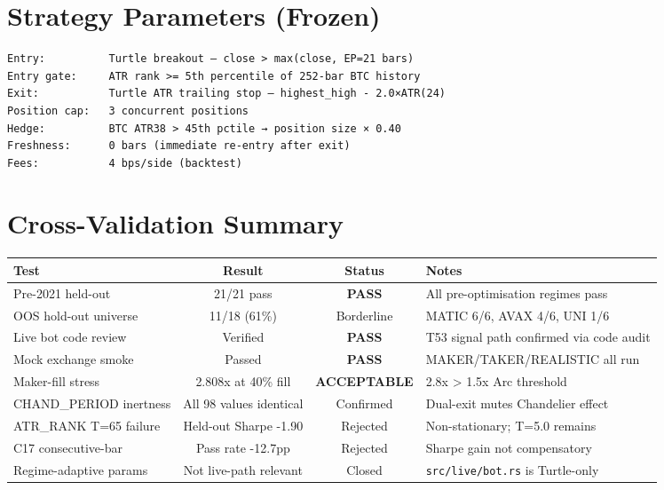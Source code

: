 \documentclass[12pt,a4paper]{article}
\begin{document}
\section{Strategy Parameters (Frozen)}

\begin{verbatim}
Entry:          Turtle breakout — close > max(close, EP=21 bars)
Entry gate:     ATR rank >= 5th percentile of 252-bar BTC history
Exit:           Turtle ATR trailing stop — highest_high - 2.0×ATR(24)
Position cap:   3 concurrent positions
Hedge:          BTC ATR38 > 45th pctile → position size × 0.40
Freshness:      0 bars (immediate re-entry after exit)
Fees:           4 bps/side (backtest)
\end{verbatim}

\section{Cross-Validation Summary}

\begin{center}
\small
\begin{tabular}{l|c|c|p{2.8in}}
\textbf{Test} & \textbf{Result} & \textbf{Status} & \textbf{Notes} \\ \midrule
Pre-2021 held-out & 21/21 pass & \textbf{PASS} & All pre-optimisation regimes pass \\
OOS hold-out universe & 11/18 (61\%) & Borderline & MATIC 6/6, AVAX 4/6, UNI 1/6 \\
Live bot code review & Verified & \textbf{PASS} & T53 signal path confirmed via code audit \\
Mock exchange smoke & Passed & \textbf{PASS} & MAKER/TAKER/REALISTIC all run \\
Maker-fill stress & 2.808x at 40\% fill & \textbf{ACCEPTABLE} & 2.8x > 1.5x Arc threshold \\
CHAND\_PERIOD inertness & All 98 values identical & Confirmed & Dual-exit mutes Chandelier effect \\
ATR\_RANK T=65 failure & Held-out Sharpe -1.90 & Rejected & Non-stationary; T=5.0 remains \\
C17 consecutive-bar & Pass rate -12.7pp & Rejected & Sharpe gain not compensatory \\
Regime-adaptive params & Not live-path relevant & Closed & \texttt{src/live/bot.rs} is Turtle-only \\
\end{tabular}
\end{center}
\end{document}
